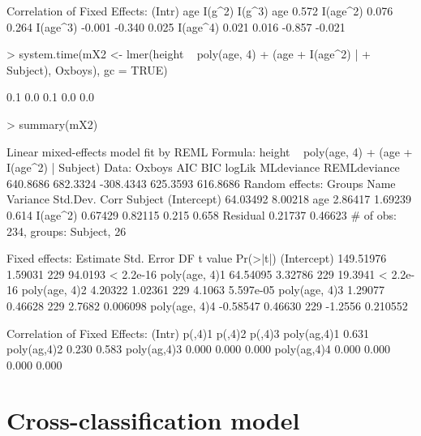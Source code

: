 \documentclass[12pt]{article}
\begin{document}
\begin{Schunk}
\begin{Soutput}
Correlation of Fixed Effects:
         (Intr) age    I(g^2) I(g^3)
age       0.572                     
I(age^2)  0.076  0.264              
I(age^3) -0.001 -0.340  0.025       
I(age^4)  0.021  0.016 -0.857 -0.021
\end{Soutput}
\begin{Sinput}
> system.time(mX2 <- lmer(height ~ poly(age, 4) + (age + I(age^2) | 
+     Subject), Oxboys), gc = TRUE)
\end{Sinput}
\begin{Soutput}
[1] 0.1 0.0 0.1 0.0 0.0
\end{Soutput}
\begin{Sinput}
> summary(mX2)
\end{Sinput}
\begin{Soutput}
Linear mixed-effects model fit by REML
Formula: height ~ poly(age, 4) + (age + I(age^2) | Subject) 
   Data: Oxboys 
      AIC      BIC    logLik MLdeviance REMLdeviance
 640.8686 682.3324 -308.4343   625.3593     616.8686
Random effects:
 Groups   Name        Variance Std.Dev. Corr        
 Subject  (Intercept) 64.03492 8.00218              
          age          2.86417 1.69239  0.614       
          I(age^2)     0.67429 0.82115  0.215 0.658 
 Residual              0.21737 0.46623              
# of obs: 234, groups: Subject, 26

Fixed effects:
               Estimate Std. Error  DF t value  Pr(>|t|)
(Intercept)   149.51976    1.59031 229 94.0193 < 2.2e-16
poly(age, 4)1  64.54095    3.32786 229 19.3941 < 2.2e-16
poly(age, 4)2   4.20322    1.02361 229  4.1063 5.597e-05
poly(age, 4)3   1.29077    0.46628 229  2.7682  0.006098
poly(age, 4)4  -0.58547    0.46630 229 -1.2556  0.210552

Correlation of Fixed Effects:
            (Intr) p(,4)1 p(,4)2 p(,4)3
poly(ag,4)1 0.631                      
poly(ag,4)2 0.230  0.583               
poly(ag,4)3 0.000  0.000  0.000        
poly(ag,4)4 0.000  0.000  0.000  0.000 
\end{Soutput}
\end{Schunk}

\section{Cross-classification model}
\label{sec:CrossClassified}
\end{document}
